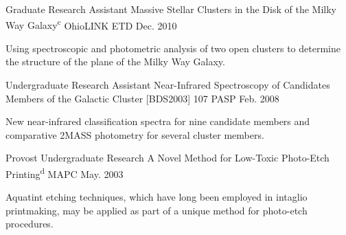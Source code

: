 \begin{cventries}
  \cventry
    {Graduate Research Assistant} %
    {Massive Stellar Clusters in the Disk of the Milky Way Galaxy\textsuperscript{c}} %
    {OhioLINK ETD} %
    {Dec. 2010} %
    {
      \begin{cvcompactparagraph}
        Using spectroscopic and photometric analysis of two open clusters to determine the structure of the plane of the Milky Way Galaxy.
      \end{cvcompactparagraph}
    }

  \cventry
    {Undergraduate Research Assistant} %
    {Near-Infrared Spectroscopy of Candidates Members of the Galactic Cluster [BDS2003] 107} %
    {PASP} %
    {Feb. 2008} %
    {
      \begin{cvcompactparagraph}
        New near-infrared classification spectra for nine candidate members and comparative 2MASS photometry for several cluster members.
      \end{cvcompactparagraph}
    }

  \cventry
    {Provost Undergraduate Research} %
    {A Novel Method for Low-Toxic Photo-Etch Printing\textsuperscript{d}} %
    {MAPC} %
    {May. 2003} %
    {
      \begin{cvcompactparagraph}
        Aquatint etching techniques, which have long been employed in intaglio printmaking, may be applied as part of a unique method for photo-etch procedures.
      \end{cvcompactparagraph}
    }

\end{cventries}
